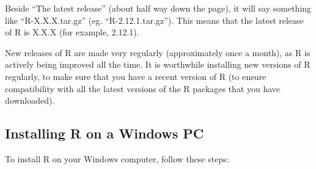 \documentclass[a4paper,10pt,english]{sphinxmanual}
\begin{document}
Beside ``The latest release'' (about half way down the page), it will say something like
``R-X.X.X.tar.gz'' (eg. ``R-2.12.1.tar.gz''). This means that the latest release of R is X.X.X (for
example, 2.12.1).

New releases of R are made very regularly (approximately once a month), as R is actively being
improved all the time. It is worthwhile installing new versions of R regularly, to make sure
that you have a recent version of R (to ensure compatibility with all the latest versions of
the R packages that you have downloaded).


\subsection{Installing R on a Windows PC}
\label{src/installr:installing-r-on-a-windows-pc}
To install R on your Windows computer, follow these steps:
\end{document}
